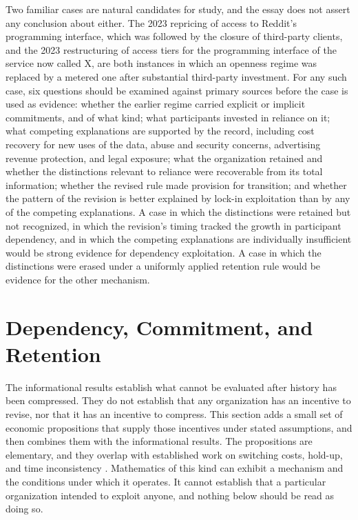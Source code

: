 \documentclass[11pt]{article}
\theoremstyle{definition}
\theoremstyle{remark}
\begin{document}
Two familiar cases are natural candidates for study, and the essay does not assert any conclusion about either. The 2023 repricing of access to Reddit's programming interface, which was followed by the closure of third-party clients, and the 2023 restructuring of access tiers for the programming interface of the service now called X, are both instances in which an openness regime was replaced by a metered one after substantial third-party investment. For any such case, six questions should be examined against primary sources before the case is used as evidence: whether the earlier regime carried explicit or implicit commitments, and of what kind; what participants invested in reliance on it; what competing explanations are supported by the record, including cost recovery for new uses of the data, abuse and security concerns, advertising revenue protection, and legal exposure; what the organization retained and whether the distinctions relevant to reliance were recoverable from its total information; whether the revised rule made provision for transition; and whether the pattern of the revision is better explained by lock-in exploitation than by any of the competing explanations. A case in which the distinctions were retained but not recognized, in which the revision's timing tracked the growth in participant dependency, and in which the competing explanations are individually insufficient would be strong evidence for dependency exploitation. A case in which the distinctions were erased under a uniformly applied retention rule would be evidence for the other mechanism.

\section{Dependency, Commitment, and Retention}\label{sec:economic}

The informational results establish what cannot be evaluated after history has been compressed. They do not establish that any organization has an incentive to revise, nor that it has an incentive to compress. This section adds a small set of economic propositions that supply those incentives under stated assumptions, and then combines them with the informational results. The propositions are elementary, and they overlap with established work on switching costs, hold-up, and time inconsistency \cite{klemperer,kca,kp}. Mathematics of this kind can exhibit a mechanism and the conditions under which it operates. It cannot establish that a particular organization intended to exploit anyone, and nothing below should be read as doing so.
\end{document}
